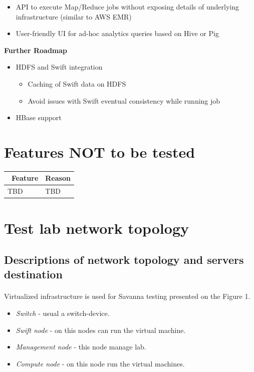 \documentclass[a4paper,11pt]{article}
\begin{document}
\begin{itemize}
    \item API to execute Map/Reduce jobs without exposing details of underlying infrastructure (similar to AWS EMR)
    \item User-friendly UI for ad-hoc analytics queries based on Hive or Pig
\end{itemize}
\textbf{Further Roadmap}
\begin{itemize}
    \item HDFS and Swift integration
	\begin{itemize}
    		\item Caching of Swift data on HDFS
        \item Avoid issues with Swift eventual consistency while running job
	\end{itemize}
    \item HBase support
\end{itemize}





\section{Features NOT to be tested}

\begin{tabular}{|p{5cm}|p{10cm}|}
\hline
\ \bf Feature & \bf Reason \\ \hline
TBD&TBD \\ \hline
\end{tabular}





\newpage
\section{Test lab network topology}

\subsection{Descriptions of network topology and servers destination}
\paragraph{} Virtualized infrastructure is used for Savanna testing presented on the Figure 1.
\begin{itemize}
\item \textit{Switch} - usual a switch-device.
\item \textit{Swift node} - on this nodes can run the virtual machine.
\item \textit{Management node} - this node manage lab.
\item \textit{Compute node} - on this node run the virtual machines.
\end{itemize}
\end{document}
